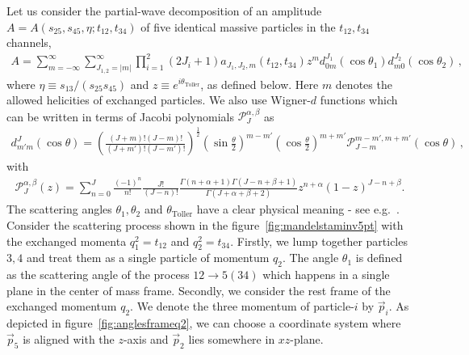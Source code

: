 Let us consider the partial-wave decomposition of an amplitude $ A =  A(s_{25}, s_{45},\eta; t_{12}, t_{34}) $ of five identical massive particles in
the  $t_{12}, t_{34}$ channels,
\begin{align}
  \label{eq:partialwavet12t34}
  A
  =\sum_{m=-\infty}^{\infty}\sum_{J_{1,2}=|m|}^{\infty} \prod_{i=1}^{2} (2 J_i+1) a_{J_1,J_2,m}(t_{12},t_{34}) z^{m} d_{0 m}^{J_1}(\cos\theta_1)d_{m 0}^{J_2}(\cos\theta_2)
  \,,
\end{align}
where  $\eta\equiv s_{13}/(s_{25}s_{45})$ and $z\equiv e^{i \theta_{\text{Toller}}}$, as defined below. Here $m$ denotes the allowed helicities of exchanged particles. 
We also use Wigner-$d$ functions which can be written in terms of Jacobi polynomials $\mathcal{P}_{J}^{\alpha,\beta}$ as
\begin{align}
  d_{m' m}^{J}(\cos\theta)=\left(\frac{\left(J+m\right)!\left(J-m\right)!}{\left(J+m'\right)!\left(J-m'\right)!}\right)^{\frac{1}{2}}\left(\sin \frac{\theta}{2}\right)^{m-m'}\left(\cos \frac{\theta}{2}\right)^{m+m'}\mathcal{P}_{J-m}^{m-m',m+m'}(\cos \theta)\,,
\end{align}
with
\begin{align}
  \mathcal{P}_{J}^{\alpha,\beta}(z)=\sum_ {n=0}^{J} \frac{(-1)^n}{n!} \frac{J!}{(J-n)!} \frac{\Gamma(n+\alpha+1)\Gamma(J-n+\beta+1)}{\Gamma(J+\alpha+\beta+2)} z^{n+\alpha} \left(1-z\right)^{J-n+\beta}
  .\end{align}
The scattering angles $\theta_1, \theta_2$ and $\theta_{\text{Toller}}$ have a clear physical meaning - see e.g.~\cite{Brower:1974yv}.
Consider the scattering process shown in the figure~\ref{fig:mandelstaminv5pt} with the exchanged momenta $q_1^2=t_{12}$ and $q_2^2=t_{34}$.
Firstly, we lump together particles $3,4$ and treat them as a single particle of momentum $q_2$.
The angle $\theta_1$ is defined as the scattering angle of the process $12\to 5 (34)$ which happens in a single plane in the center of mass frame.
Secondly, we consider the rest frame of the exchanged momentum $q_2$.
We denote the three momentum of particle-$i$ by $\vec{p}_i$.
As depicted in figure~\ref{fig:anglesframeq2}, we can choose a coordinate system where $\vec{p}_5$ is aligned with the $z$-axis and $\vec{p}_2$ lies somewhere in $xz$-plane.
